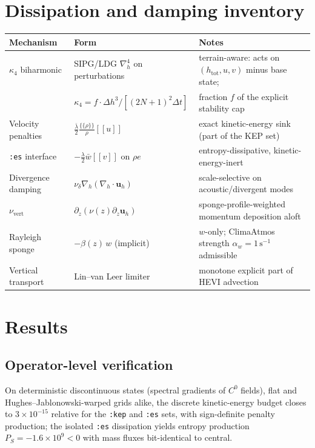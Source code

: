 \documentclass[11pt]{article}
\newcommand{\uu}{\boldsymbol{u}}
\newcommand{\uh}{\uu_h}
\newcommand{\jump}[1]{[\![#1]\!]}
\newcommand{\avg}[1]{\{\!\!\{#1\}\!\!\}}
\begin{document}
\section{Dissipation and damping inventory}
\label{sec:diss}

\begin{center}
\begin{tabular}{@{}lll@{}}
\toprule
Mechanism & Form & Notes\\
\midrule
$\kappa_4$ biharmonic & SIPG/LDG $\nabla_h^4$ on perturbations & terrain-aware:
acts on $(h_{\mathrm{tot}}, u, v)$ minus base state;\\
 & $\kappa_4 = f\cdot \Delta h^3/[(2N{+}1)^2\Delta t]$ & fraction $f$ of the
explicit stability cap\\
Velocity penalties & $\frac{\bar\lambda}{2}\frac{\avg{\rho}}{\rho}\jump{u}$ &
exact kinetic-energy sink (part of the KEP set)\\
\texttt{:es} interface & $-\frac{\lambda}{2}\bar w\jump{v}$ on $\rho e$ &
entropy-dissipative, kinetic-energy-inert\\
Divergence damping & $\nu_\delta \nabla_h(\nabla_h\!\cdot\uh)$ &
scale-selective on acoustic/divergent modes\\
$\nu_{\mathrm{vert}}$ & $\partial_z(\nu(z)\partial_z \uh)$ &
sponge-profile-weighted momentum deposition aloft\\
Rayleigh sponge & $-\beta(z)\,w$ (implicit) & $w$-only; ClimaAtmos strength
$\alpha_w = 1\,\mathrm{s^{-1}}$ admissible\\
Vertical transport & Lin--van Leer limiter & monotone explicit part of
HEVI advection\\
\bottomrule
\end{tabular}
\end{center}

\section{Results}
\label{sec:results}

\subsection{Operator-level verification}

On deterministic discontinuous states (spectral gradients of $C^0$
fields), flat and Hughes--Jablonowski-warped grids alike, the discrete
kinetic-energy budget closes to $3\times10^{-15}$ relative for the
\texttt{:kep} and \texttt{:es} sets, with sign-definite penalty
production; the isolated \texttt{:es} dissipation yields entropy
production $P_S = -1.6\times10^{9} < 0$ with mass fluxes bit-identical to
central.
\end{document}
